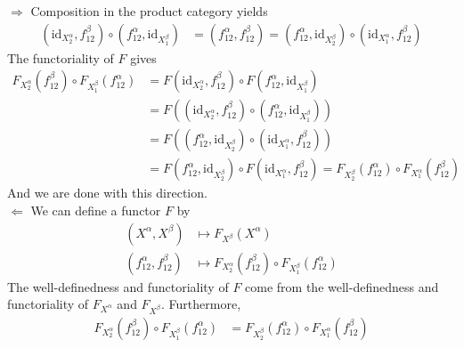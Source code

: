 \begin{prf}
{\glqq}$\Rightarrow${\grqq}
\qquad
Composition in the product category yields
\begin{align*}
  \left(
    \mathrm{id}_{X_{2}^{\alpha}},
    f_{12}^{\beta}
  \right)
  \circ
  \left(
    f_{12}^{\alpha},
    \mathrm{id}_{X_{1}^{\beta}}
  \right)
  &=
  (f_{12}^{\alpha},f_{12}^{\beta})
  =
  \left(
    f_{12}^{\alpha},
    \mathrm{id}_{X_{2}^{\beta}}
  \right)
  \circ
  \left(
    \mathrm{id}_{X_{1}^{\alpha}},
    f_{12}^{\beta}
  \right)
\end{align*}
The functoriality of $F$ gives
\begin{align*}
  F_{X_{2}^{\alpha}}(f_{12}^{\beta})
  \circ
  F_{X_{1}^{\beta}}(f_{12}^{\alpha})
  &=
  F
  \left(
    \mathrm{id}_{X_{2}^{\alpha}},
    f_{12}^{\beta}
  \right)
  \circ
  F
  \left(
    f_{12}^{\alpha},
    \mathrm{id}_{X_{1}^{\beta}}
  \right)
  \\
  &=
  F
  \left(
    \left(
      \mathrm{id}_{X_{2}^{\alpha}},
      f_{12}^{\beta}
    \right)
    \circ
    \left(
      f_{12}^{\alpha},
      \mathrm{id}_{X_{1}^{\beta}}
    \right)
  \right)
  \\
  &=
  F
  \left(
    \left(
      f_{12}^{\alpha},
      \mathrm{id}_{X_{2}^{\beta}}
    \right)
    \circ
    \left(
      \mathrm{id}_{X_{1}^{\alpha}},
      f_{12}^{\beta}
    \right)
  \right)
  \\
  &=
  F
  \left(
    f_{12}^{\alpha},
    \mathrm{id}_{X_{2}^{\beta}}
  \right)
  \circ
  F
  \left(
    \mathrm{id}_{X_{1}^{\alpha}},
    f_{12}^{\beta}
  \right)
  =
  F_{X_{2}^{\beta}}(f_{12}^{\alpha})
  \circ
  F_{X_{1}^{\alpha}}(f_{12}^{\beta})
\end{align*}
And we are done with this direction.
\\
{\glqq}$\Leftarrow${\grqq}
\qquad
We can define a functor $F$ by
\begin{align*}
  (X^{\alpha},X^{\beta})
  &\mapsto
  F_{X^{\beta}}(X^{\alpha})
  \\
  (f_{12}^{\alpha},f_{12}^{\beta})
  &\mapsto
  F_{X_{2}^{\alpha}}(f_{12}^{\beta})
  \circ
  F_{X_{1}^{\beta}}(f_{12}^{\alpha})
\end{align*}
The well-definedness and functoriality of $F$ come from the well-definedness and functoriality of $F_{X^{\alpha}}$ and $F_{X^{\beta}}$.
Furthermore,
\begin{align*}
  F_{X_{2}^{\alpha}}(f_{12}^{\beta})
  \circ
  F_{X_{1}^{\beta}}(f_{12}^{\alpha})
  &=
  F_{X_{2}^{\beta}}(f_{12}^{\alpha})
  \circ
  F_{X_{1}^{\alpha}}(f_{12}^{\beta})

\end{align*}
\end{prf}
